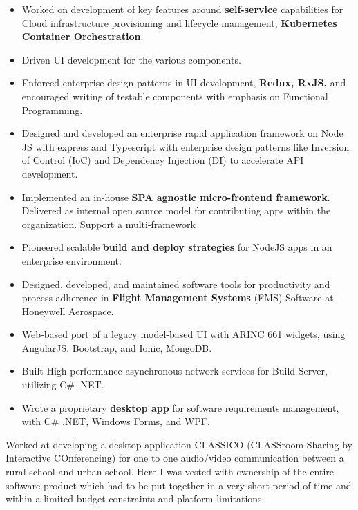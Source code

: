 \documentclass[10pt,a4paper,ragged2e,withhyper]{altacv}
\begin{document}
\begin{paracol}{2}
\begin{itemize}
  \item Worked on development of key features around \textbf{self-service} capabilities for Cloud infrastructure provisioning and lifecycle management, \textbf{Kubernetes Container Orchestration}.
  \item Driven UI development for the various components.
  \item Enforced enterprise design patterns in UI development, \textbf{Redux, RxJS,} and encouraged writing of testable components with emphasis on Functional Programming.
  \item Designed and developed an enterprise rapid application framework on Node JS with express and Typescript with enterprise design patterns like Inversion of Control (IoC) and Dependency Injection (DI) to accelerate API development.
  \item Implemented an in-house \textbf{SPA agnostic micro-frontend framework}. Delivered as internal open source model for contributing apps within the organization. Support a multi-framework
  \item Pioneered scalable \textbf{build and deploy strategies} for NodeJS apps in an enterprise environment.
\end{itemize}

\divider

\begin{itemize}
  \item Designed, developed, and maintained software tools for productivity and process adherence in \textbf{Flight Management Systems} (FMS) Software at Honeywell Aerospace.
  \item Web-based port of a legacy model-based UI with ARINC 661 widgets, using AngularJS, Bootstrap, and Ionic, MongoDB.
  \item Built High-performance asynchronous network services for Build Server, utilizing C\# .NET.
  \item Wrote a proprietary \textbf{desktop app} for software requirements management, with C\# .NET, Windows Forms, and WPF.
\end{itemize}

\divider

Worked at developing a desktop application CLASSICO (CLASSroom Sharing by Interactive COnferencing) for one to one audio/video communication between a rural school and urban school. Here I was vested with ownership of the entire software product which had to be put together in a very short period of time and within a limited budget constraints and platform limitations. 


\end{paracol}
\end{document}
